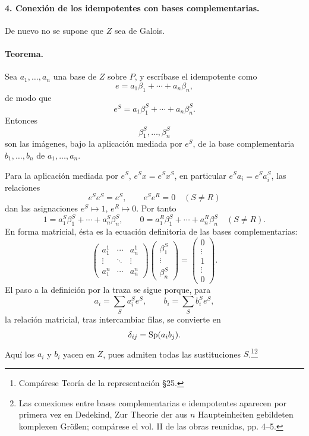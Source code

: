 \paragraph{4. Conexión de los idempotentes con bases complementarias.}
De nuevo no se supone que \(Z\) sea de Galois.

\paragraph{Teorema.}
Sea \(a_1,\ldots,a_n\) una base de \(Z\) sobre \(P\), y escríbase el idempotente como
\[
        e=a_1\beta_1+\cdots+a_n\beta_n,
\]
de modo que
\[
        e^S=a_1\beta_1^S+\cdots+a_n\beta_n^S .
\]
Entonces
\[
        \beta_1^S,\ldots,\beta_n^S
\]
son las imágenes, bajo la aplicación mediada por \(e^S\), de la base complementaria \(b_1,\ldots,b_n\) de \(a_1,\ldots,a_n\).

Para la aplicación mediada por \(e^S\), \(e^Sx=e^Sx^S\), en particular \(e^Sa_i=e^Sa_i^S\), las relaciones
\[
        e^Se^S=e^S,
        \qquad e^Se^R=0\quad(S\ne R)
\]
dan las asignaciones \(e^S\mapsto1\), \(e^R\mapsto0\). Por tanto
\[
        1=a_1^S\beta_1^S+\cdots+a_n^S\beta_n^S,
        \qquad
        0=a_1^R\beta_1^S+\cdots+a_n^R\beta_n^S\quad(S\ne R).
\]
En forma matricial, ésta es la ecuación definitoria de las bases complementarias:
\[
\begin{pmatrix}
 a_1^1 & \cdots & a_n^1\\
 \vdots & \ddots & \vdots\\
 a_1^n & \cdots & a_n^n
\end{pmatrix}
\begin{pmatrix}
 \beta_1^S\\ \vdots\\ \beta_n^S
\end{pmatrix}
=
\begin{pmatrix}
0\\ \vdots\\ 1\\ \vdots\\ 0
\end{pmatrix}.
\]
El paso a la definición por la traza se sigue porque, para
\[
        a_i=\sum_S a_i^S e^S,
        \qquad b_i=\sum_S b_i^S e^S,
\]
la relación matricial, tras intercambiar filas, se convierte en
\[
        \delta_{ij}=\operatorname{Sp}(a_i b_j).
\]
Aquí los \(a_i\) y \(b_i\) yacen en \(Z\), pues admiten todas las sustituciones \(S\).\footnote{Compárese Teoría de la representación §25.}\footnote{Las conexiones entre bases complementarias e idempotentes aparecen por primera vez en Dedekind, Zur Theorie der aus \(n\) Haupteinheiten gebildeten komplexen Größen; compárese el vol. II de las obras reunidas, pp. 4--5.}

